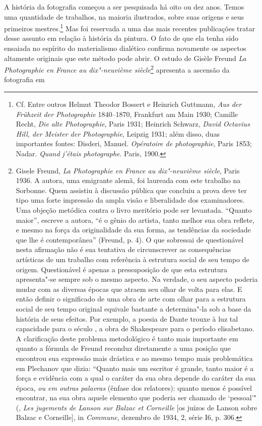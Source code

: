 A história da fotografia começou a ser pesquisada há oito ou dez anos.
Temos uma quantidade de trabalhos, na maioria ilustrados, sobre suas
origens e seus primeiros mestres.\footnote{Cf. Entre outros Helmut
  Theodor Bossert e Heinrich Guttmann, \emph{Aus der Frühzeit der
  Photographie} 1840--1870, Frankfurt am Main 1930; Camille Recht,
  \emph{Die alte Photographie}, Paris 1931; Heinrich Schwarz,
  \emph{David Octavius Hill, der Meister der Photographie}, Leipzig
  1931; além disso, duas importantes fontes: Disderi, Manuel.
  \emph{Opératoire de photographie}, Paris 1853; Nadar. \emph{Quand
  j'étais photographe}. Paris, 1900.} Mas foi reservada a uma das mais recentes
publicações tratar desse assunto em relação à história da
pintura. O fato de que ela tenha sido ensaiada no espírito do materialismo
dialético confirma novamente os aspectos altamente
originais que este método pode abrir. O estudo de Gisèle Freund \emph{La
Photographie en France au dix"-neuvième siècle}\footnote{Gisele Freund,
  \emph{La Photographie en France au dix"-neuvième siècle}, Paris 1936. A
  autora, uma emigrante alemã, foi laureada com este trabalho na
  Sorbonne. Quem assistiu à discussão pública que concluiu a prova deve
  ter tipo uma forte impressão da ampla visão e liberalidade dos
  examinadores. Uma objeção metódica contra o livro meritório pode ser
  levantada. ``Quanto maior'', escreve a autora, ``é o gênio do artista,
  tanto melhor sua obra reflete, e mesmo na força da originalidade da
  sua forma, as tendências da sociedade que lhe é contemporânea''
  (Freund, p. 4). O que sobressai de questionável nesta afirmação não é
  sua tentativa de circunscrever as consequências artísticas de um
  trabalho com referência à estrutura social de seu tempo de origem.
  Questionável é apenas a pressuposição de que esta estrutura
  apresenta"-se sempre sob o mesmo aspecto. Na verdade, o seu aspecto
  poderia mudar com as diversas épocas que atraem seu olhar de volta
  para elas. E então definir o significado de uma obra de arte com olhar
  para a estrutura social de seu tempo original equivale bastante a
  determina"-la sob a base da história de seus efeitos. Por exemplo, a
  poesia de Dante trouxe à luz tal capacidade para o século , a obra
  de Shakespeare para o período elisabetano. A clarificação deste
  problema metodológico é tanto mais importante em quanto a fórmula de
  Freund reconduz diretamente a uma posição que encontrou sua
  expressão mais drástica e ao mesmo tempo mais problemática em
  Plechanov que dizia: ``Quanto mais um escritor é grande, tanto maior é
  a força e evidência com a qual o caráter da sua obra depende do
  caráter da sua época, \emph{ou em outras palavras} (ênfase dos
  relatores): quanto menos é possível encontrar, na sua obra aquele
  elemento que poderia ser chamado de `pessoal'" (,
  \emph{Les jugements de Lanson sur Balzac et Corneille} {[}os juízos de
  Lanson sobre Balzac e Corneille{]}, in \emph{Commune}, dezembro de
  1934, 2, série I6, p. 306.} apresenta a ascensão da fotografia em
